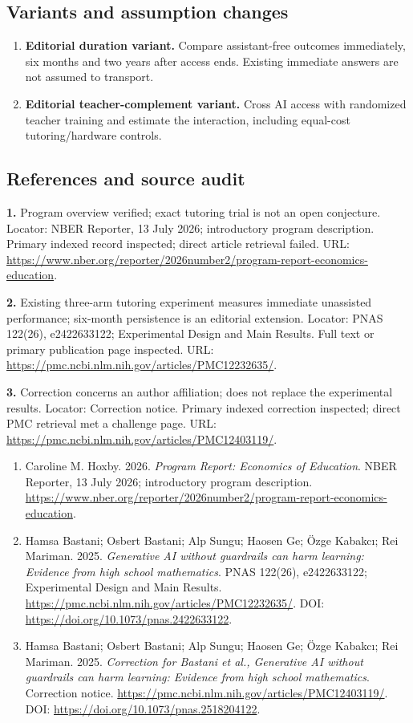 \documentclass[11pt,a4paper]{article}
\begin{document}
\subsection*{Variants and assumption changes}
\begin{enumerate}
\item \textbf{Editorial duration variant.} Compare assistant-free outcomes immediately, six months and two years after access ends. Existing immediate answers are not assumed to transport.
\item \textbf{Editorial teacher-complement variant.} Cross AI access with randomized teacher training and estimate the interaction, including equal-cost tutoring/hardware controls.
\end{enumerate}
\subsection*{References and source audit}
\textbf{1.} Program overview verified; exact tutoring trial is not an open conjecture. Locator: NBER Reporter, 13 July 2026; introductory program description. Primary indexed record inspected; direct article retrieval failed. URL: \url{https://www.nber.org/reporter/2026number2/program-report-economics-education}.

\textbf{2.} Existing three-arm tutoring experiment measures immediate unassisted performance; six-month persistence is an editorial extension. Locator: PNAS 122(26), e2422633122; Experimental Design and Main Results. Full text or primary publication page inspected. URL: \url{https://pmc.ncbi.nlm.nih.gov/articles/PMC12232635/}.

\textbf{3.} Correction concerns an author affiliation; does not replace the experimental results. Locator: Correction notice. Primary indexed correction inspected; direct PMC retrieval met a challenge page. URL: \url{https://pmc.ncbi.nlm.nih.gov/articles/PMC12403119/}.
\begin{enumerate}\raggedright
\item\hypertarget{definitions:source:30007735:1}{} Caroline M. Hoxby. 2026. \emph{Program Report: Economics of Education}. NBER Reporter, 13 July 2026; introductory program description.
\url{https://www.nber.org/reporter/2026number2/program-report-economics-education}.
\item\hypertarget{definitions:source:30007735:2}{} Hamsa Bastani; Osbert Bastani; Alp Sungu; Haosen Ge; \"{O}zge Kabakc\i{}; Rei Mariman. 2025. \emph{Generative AI without guardrails can harm learning: Evidence from high school mathematics}. PNAS 122(26), e2422633122; Experimental Design and Main Results.
\url{https://pmc.ncbi.nlm.nih.gov/articles/PMC12232635/}.
DOI: \url{https://doi.org/10.1073/pnas.2422633122}.
\item\hypertarget{definitions:source:30007735:3}{} Hamsa Bastani; Osbert Bastani; Alp Sungu; Haosen Ge; \"{O}zge Kabakc\i{}; Rei Mariman. 2025. \emph{Correction for Bastani et al., Generative AI without guardrails can harm learning: Evidence from high school mathematics}. Correction notice.
\url{https://pmc.ncbi.nlm.nih.gov/articles/PMC12403119/}.
DOI: \url{https://doi.org/10.1073/pnas.2518204122}.
\end{enumerate}
\end{document}
